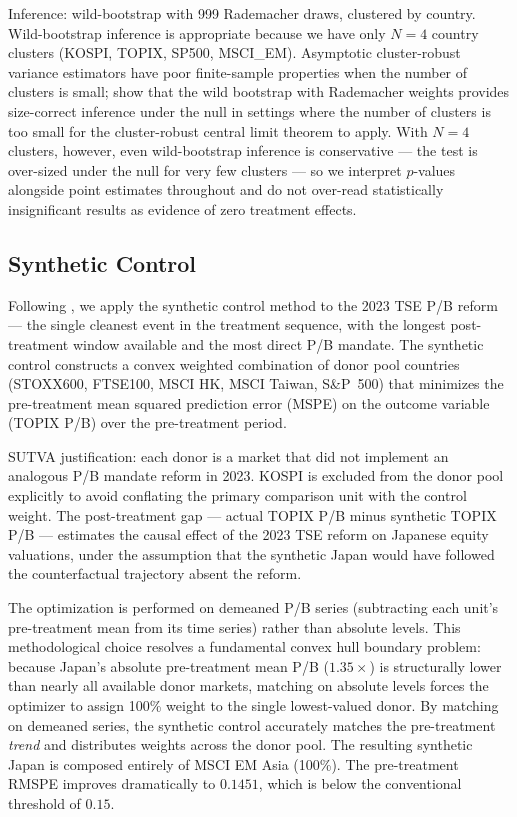 \documentclass[12pt]{article}
\begin{document}
Inference: wild-bootstrap with 999 Rademacher draws, clustered by country. Wild-bootstrap
inference is appropriate because we have only $N = 4$ country clusters (KOSPI, TOPIX, SP500,
MSCI\_EM). Asymptotic cluster-robust variance estimators have poor finite-sample properties
when the number of clusters is small; \citet{cameron2008} show that the wild bootstrap with
Rademacher weights provides size-correct inference under the null in settings where the
number of clusters is too small for the cluster-robust central limit theorem to apply. With
$N = 4$ clusters, however, even wild-bootstrap inference is conservative --- the test is
over-sized under the null for very few clusters --- so we interpret $p$-values alongside
point estimates throughout and do not over-read statistically insignificant results as
evidence of zero treatment effects.

\subsection{Synthetic Control}

Following \citet{abadie2010}, we apply the synthetic control method to the 2023 TSE P/B
reform --- the single cleanest event in the treatment sequence, with the longest post-treatment
window available and the most direct P/B mandate. The synthetic control constructs a convex
weighted combination of donor pool countries (STOXX600, FTSE100, MSCI HK, MSCI Taiwan,
S\&P~500) that minimizes the pre-treatment mean squared prediction error (MSPE) on the
outcome variable (TOPIX P/B) over the pre-treatment period.

SUTVA justification: each donor is a market that did not implement an analogous P/B mandate
reform in 2023. KOSPI is excluded from the donor pool explicitly to avoid conflating the
primary comparison unit with the control weight. The post-treatment gap --- actual TOPIX P/B
minus synthetic TOPIX P/B --- estimates the causal effect of the 2023 TSE reform on Japanese
equity valuations, under the assumption that the synthetic Japan would have followed the
counterfactual trajectory absent the reform.

The optimization is performed on demeaned P/B series (subtracting each unit's pre-treatment mean from its time series) rather than absolute levels. This methodological choice resolves a fundamental convex hull boundary problem: because Japan's absolute pre-treatment mean P/B ($1.35\times$) is structurally lower than nearly all available donor markets, matching on absolute levels forces the optimizer to assign 100\% weight to the single lowest-valued donor. By matching on demeaned series, the synthetic control accurately matches the pre-treatment \textit{trend} and distributes weights across the donor pool. The resulting synthetic Japan is composed entirely of MSCI EM Asia (100\%). The pre-treatment RMSPE improves dramatically to $0.1451$, which is below the conventional threshold of $0.15$.
\end{document}
